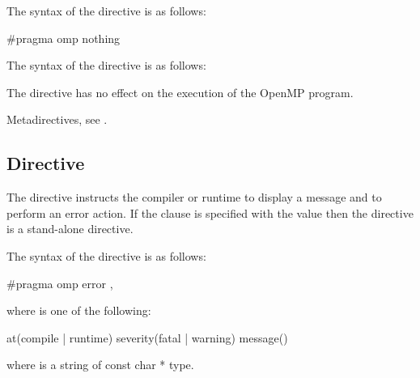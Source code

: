 \syntax
\begin{ccppspecific}
\begin{samepage}
The syntax of the  directive is as follows:

\begin{ompcPragma}
#pragma omp nothing 
\end{ompcPragma}
\end{samepage}
\end{ccppspecific}

\begin{fortranspecific}
\begin{samepage}
The syntax of the  directive is as follows:

\end{samepage}
\end{fortranspecific}

\descr

The  directive has no effect on the execution of 
the OpenMP program. 

\begin{crossrefs}
\item Metadirectives, see .
\end{crossrefs}



\subsection{ Directive}
\label{subsec:error Directive}
\summary
The  directive instructs the compiler or runtime to display
a message and to perform an error action. If the  clause is
specified with the  value then the  directive 
is a stand-alone directive.

\syntax
\begin{ccppspecific}
\begin{samepage}
The syntax of the  directive is as follows:

\begin{ompcPragma}
#pragma omp error \plc{[clause[ [},\plc{] clause] ... ] new-line}
\end{ompcPragma}
\end{samepage}

\begin{samepage}
where  is one of the following{}:

\begin{indentedcodelist}
at(compile | runtime)
severity(fatal | warning)
message()
\end{indentedcodelist}

where  is a string of const char * type.
\end{samepage}
\end{ccppspecific}

